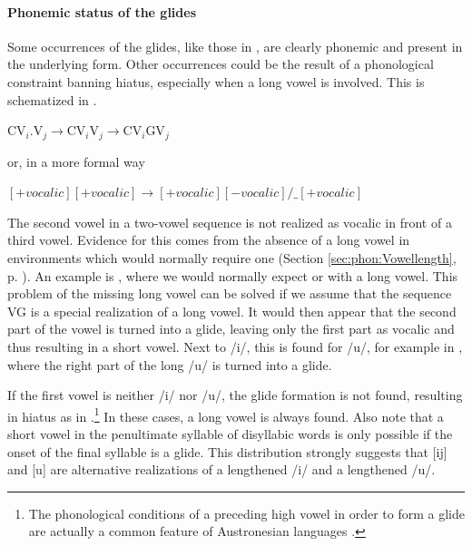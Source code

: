 \paragraph{Phonemic status of the glides}\label{sec:phon:nonphonemicglideformation}
Some occurrences of the glides, like those in , are clearly phonemic and present in the underlying form. Other occurrences could be the result of a phonological constraint banning hiatus, especially when a long vowel is involved. This is schematized in  \citep[cf.][23]{Tapovanaye1995}.

\ea\label{ex:phon:glide:threemorae} CV$_i$.V$_j\to$CV$_i$\textipa{:}V$_j\to$CV$_i$GV$_j$\z

or, in a more formal way

\ea\label{ex:phon:glide:threemorae:formal} $[+vocalic][+vocalic]\to[+vocalic][-vocalic]/\_[+vocalic]$ \z

The second vowel in a two-vowel sequence is not realized as vocalic in front of a third vowel. Evidence for this comes from the absence of a long vowel in environments which would normally require one (Section \ref{sec:phon:Vowellength}, p. \pageref{sec:phon:Vowellength}). An example is , where we would normally expect  or  with a long vowel. This problem of the missing long vowel can be solved if we assume that the sequence VG is a special realization of a long vowel.
It would then appear that the second part of the vowel is turned into a glide, leaving only the first part as vocalic and thus resulting in a short vowel.
Next to /i/, this is found for /u/, for example in , where the right part of the long /u/ is turned into a glide.

If the first vowel is neither /i/ nor /u/, the glide formation is not found, resulting in hiatus as in .\footnote{The phonological conditions of a preceding high vowel in order to form a glide are actually a common feature of Austronesian languages \citep[116]{Himmelmann2005typochar}.} In these cases, a long vowel is always found. Also note that a short vowel in the penultimate syllable of  disyllabic words is only possible if the onset of the final syllable is a glide. This distribution strongly suggests that [ij] and [u\V] are alternative realizations of a lengthened /i/ and a lengthened /u/.

